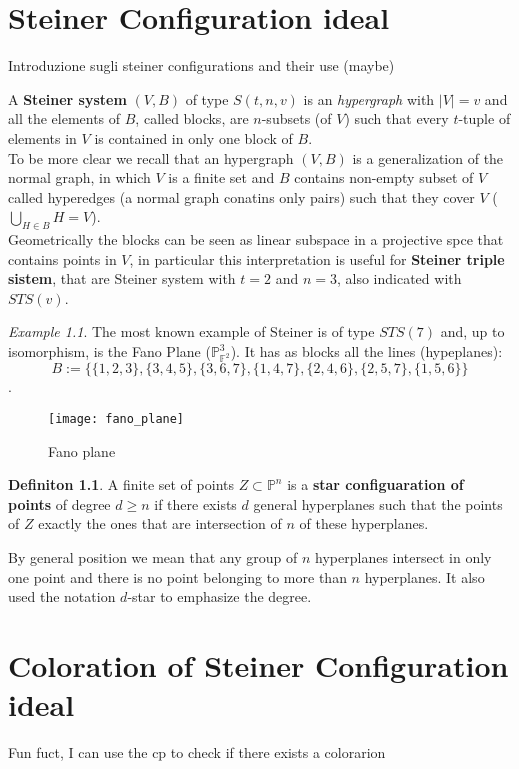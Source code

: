 \documentclass[]{book}
\theoremstyle{plain}
\theoremstyle{remark}
\newtheorem{ex}[rem]{Example}
\theoremstyle{definition}
\newtheorem{deff}[teo]{Definiton}
\newcommand{\PP}{\mathbb{P}}
\begin{document}
\chapter{Steiner Configuration ideal}

\begin{tcolorbox}
Introduzione sugli steiner configurations and their use (maybe)
\end{tcolorbox}

A \textbf{Steiner system} $ (V,B) $ of type $ S(t,n,v) $ is an \textit{hypergraph} with $ |V|=v $ and all the elements of $ B $, called blocks, are $ n $-subsets (of $ V $) such that every $ t $-tuple of elements in $ V $ is contained in only one block of $ B $. \\
To be more clear we recall that an hypergraph $ (V,B) $ is a generalization of the normal graph, in which $ V $ is a finite set and $ B $ contains non-empty subset of $ V $ called hyperedges (a normal graph conatins only pairs) such that they cover $ V $ ($ \bigcup_{H \in B} H = V $).\\
Geometrically the blocks can be seen as linear subspace in a projective spce that contains points in $ V $, in particular this interpretation is useful for \textbf{Steiner triple sistem}, that are Steiner system with $ t=2 $ and $ n=3 $, also indicated with $ STS(v) $. 

\begin{ex}
	The most known example of Steiner is of type $ STS(7) $ and, up to isomorphism, is the Fano Plane ($ \PP_{\mathbb{F}^2}^3 $). It has as blocks all the lines (hypeplanes):
	\[B := \{\{1, 2, 3\}, \{3, 4, 5\}, \{3, 6, 7\}, \{1, 4, 7\}, \{2, 4, 6\}, \{2, 5, 7\}, \{1, 5, 6\}\}\].
\end{ex}

\begin{figure}
\texttt{[image: fano\_plane]}
\caption{Fano plane}
\label{fig:fanoplane}
\end{figure}


\begin{deff}
A finite set of points $ Z \subset \PP^n $ is a \textbf{star configuaration of points} of degree $ d \geq n $ if there exists $ d $ general hyperplanes such that the points of $ Z $ exactly the ones that are intersection of $ n $ of these hyperplanes.
\end{deff}
By general position we mean that any group of $ n $ hyperplanes intersect in only one point and there is no point belonging to more than $ n $ hyperplanes. It also used the notation $ d $-star to emphasize the degree. 


\chapter{Coloration of Steiner Configuration ideal}
Fun fuct, I can use the cp to check if there exists a colorarion


\backmatter
\printbibliography
\end{document}
